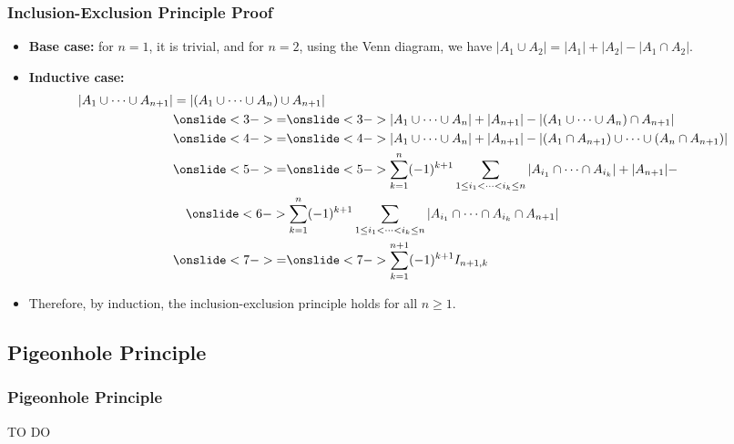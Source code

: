 \documentclass{beamer}
\begin{document}
\begin{frame}%
\frametitle{Inclusion-Exclusion Principle Proof}

\scriptsize

\begin{itemize}

\item \textbf{Base case:} for $n = 1$, it is trivial, and for $n = 2$, using the Venn diagram, we have
$|A_1 \cup A_2| = |A_1| + |A_2| - |A_1 \cap A_2|$.

\vspace{0.3cm}

\item<2-> \textbf{Inductive case:}
\begin{align*}
|A_1 \cup \cdots \cup A_{n+1}| & = |(A_1 \cup \cdots \cup A_n) \cup A_{n+1}|&\\
& \onslide<3->{=}  \onslide<3->{|A_1 \cup \cdots \cup A_n| + |A_{n+1}| - |(A_1 \cup \cdots \cup A_n) \cap A_{n+1}|}&\\
& \onslide<4->{=}  \onslide<4->{|A_1 \cup \cdots \cup A_n| + |A_{n+1}| - |(A_1 \cap A_{n+1}) \cup \cdots \cup (A_n \cap A_{n+1})|}&\\
& \onslide<5->{=}  \onslide<5->{\sum_{k = 1}^n (-1)^{k+1} \sum_{1 \le i_1 < \cdots < i_k \le n} |A_{i_1} \cap \cdots \cap A_{i_k}| + |A_{n+1}| - }&\\
& \quad \onslide<6->{\sum_{k = 1}^n (-1)^{k+1} \sum_{1 \le i_1 < \cdots < i_k \le n} |A_{i_1} \cap \cdots \cap A_{i_k} \cap A_{n+1}|}&\\
& \onslide<7->{=} \onslide<7->{\sum_{k = 1}^{n+1} (-1)^{k+1} I_{n+1, k}}&
\end{align*}

\item<8-> Therefore, by induction, the inclusion-exclusion principle holds for all $n \ge 1$.

\end{itemize}

\end{frame}

\subsection{Pigeonhole Principle}

\begin{frame}%
\frametitle{Pigeonhole Principle}

TO DO

\end{frame}
\end{document}

